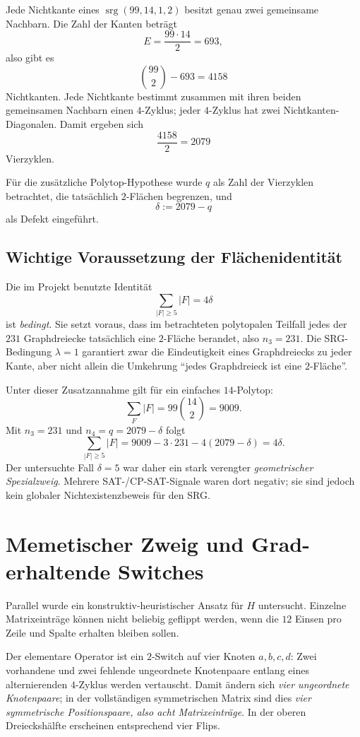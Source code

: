 \documentclass[11pt,a4paper]{article}
\newcommand{\srg}{\operatorname{srg}}
\begin{document}
Jede Nichtkante eines $\srg(99,14,1,2)$ besitzt genau zwei gemeinsame Nachbarn. Die Zahl der Kanten beträgt
\[
E=\frac{99\cdot14}{2}=693,
\]
also gibt es
\[
\binom{99}{2}-693=4158
\]
Nichtkanten. Jede Nichtkante bestimmt zusammen mit ihren beiden gemeinsamen Nachbarn einen $4$-Zyklus; jeder $4$-Zyklus hat zwei Nichtkanten-Diagonalen. Damit ergeben sich
\[
\frac{4158}{2}=2079
\]
Vierzyklen.

Für die zusätzliche Polytop-Hypothese wurde $q$ als Zahl der Vierzyklen betrachtet, die tatsächlich $2$-Flächen begrenzen, und
\[
\delta:=2079-q
\]
als Defekt eingeführt.

\subsection{Wichtige Voraussetzung der Flächenidentität}

Die im Projekt benutzte Identität
\[
\sum_{|F|\ge5}|F|=4\delta
\]
ist \emph{bedingt}. Sie setzt voraus, dass im betrachteten polytopalen Teilfall jedes der $231$ Graphdreiecke tatsächlich eine $2$-Fläche berandet, also $n_3=231$. Die SRG-Bedingung $\lambda=1$ garantiert zwar die Eindeutigkeit eines Graphdreiecks zu jeder Kante, aber nicht allein die Umkehrung ``jedes Graphdreieck ist eine $2$-Fläche''.

Unter dieser Zusatzannahme gilt für ein einfaches $14$-Polytop:
\[
\sum_F |F|=99\binom{14}{2}=9009.
\]
Mit $n_3=231$ und $n_4=q=2079-\delta$ folgt
\[
\sum_{|F|\ge5}|F|
=9009-3\cdot231-4(2079-\delta)
=4\delta.
\]
Der untersuchte Fall $\delta=5$ war daher ein stark verengter \emph{geometrischer Spezialzweig}. Mehrere SAT-/CP-SAT-Signale waren dort negativ; sie sind jedoch kein globaler Nichtexistenzbeweis für den SRG.

\section{Memetischer Zweig und Grad-erhaltende Switches}

Parallel wurde ein konstruktiv-heuristischer Ansatz für $H$ untersucht. Einzelne Matrixeinträge können nicht beliebig geflippt werden, wenn die $12$ Einsen pro Zeile und Spalte erhalten bleiben sollen.

Der elementare Operator ist ein $2$-Switch auf vier Knoten $a,b,c,d$: Zwei vorhandene und zwei fehlende ungeordnete Knotenpaare entlang eines alternierenden $4$-Zyklus werden vertauscht. Damit ändern sich \emph{vier ungeordnete Knotenpaare}; in der vollständigen symmetrischen Matrix sind dies \emph{vier symmetrische Positionspaare, also acht Matrixeinträge}. In der oberen Dreieckshälfte erscheinen entsprechend vier Flips.
\end{document}
